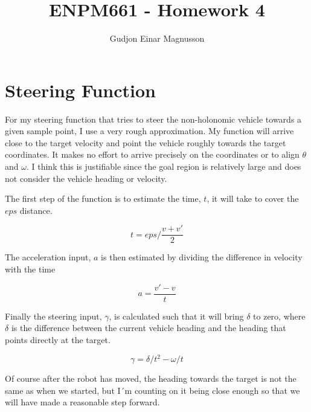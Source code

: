 \documentclass[12pt]{article}
\begin{document}
\title{ENPM661 - Homework 4}
\author{Gudjon Einar Magnusson}

\maketitle

\section{Steering Function}

For my steering function that tries to steer the non-holonomic vehicle towards a given sample point, I use a very rough approximation. My function will arrive close to the target velocity and point the vehicle roughly towards the target coordinates. It makes no effort to arrive precisely on the coordinates or to align $\theta$ and $\omega$. I think this is justifiable since the goal region is relatively large and does not consider the vehicle heading or velocity.

The first step of the function is to estimate the time, $t$, it will take to cover the $eps$ distance.

\begin{equation} \label{eq_t}
	t = eps / \frac{v + v'}{2}
\end{equation}

The acceleration input, $a$ is then estimated by dividing the difference in velocity with the time

\begin{equation}
	a = \frac{v' - v}{t}
\end{equation}

Finally the steering input, $\gamma$, is calculated such that it will bring $\delta$ to zero, where $\delta$ is the difference between the current vehicle heading and the heading that points directly at the target. 

\begin{equation}
	\gamma = \delta /t^2 - \omega / t
\end{equation}

Of course after the robot has moved, the heading towards the target is not the same as when we started, but I´m counting on it being close enough so that we will have made a reasonable step forward.
\end{document}

